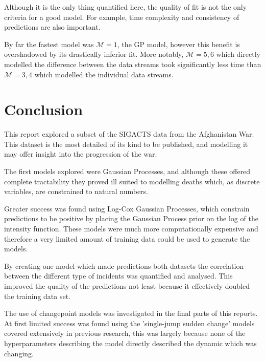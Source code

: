 \documentclass[a4paper,11pt]{report}
\begin{document}
Although it is the only thing quantified here, the quality of fit is not the only criteria for a good model. For example, time complexity and consistency of predictions are also important. \par 

By far the fastest model was \(\mathcal{M}=1\), the GP model, however this benefit is overshadowed by its drastically inferior fit. More notably, \(\mathcal{M}=5,6\) which directly modelled the difference between the data streams took significantly less time than \(\mathcal{M}=3,4\) which modelled the individual data streams. 


\chapter{Conclusion}

This report explored a subset of the SIGACTS data from the Afghanistan War. This dataset is the most detailed of its kind to be published, and modelling it may offer insight into the progression of the war. \par

The first models explored were Gaussian Processes, and although these offered complete tractability they proved ill suited to modelling deaths which, as discrete variables, are constrained to natural numbers. \par

Greater success was found using Log-Cox Gaussian Processes, which constrain predictions to be positive by placing the Gaussian Process prior on the log of the intensity function. These models were much more computationally expensive and therefore a very limited amount of training data could be used to generate the models. \par

By creating one model which made predictions both datasets the correlation between the different type of incidents was quantified and analysed. This improved the quality of the predictions not least because it effectively doubled the training data set. \par

The use of changepoint models was investigated in the final parts of this reports. At first limited success was found using the 'single-jump sudden change' models covered extensively in previous research, this was largely because none of the hyperparameters describing the model directly described the dynamic which was changing. \par
\end{document}
